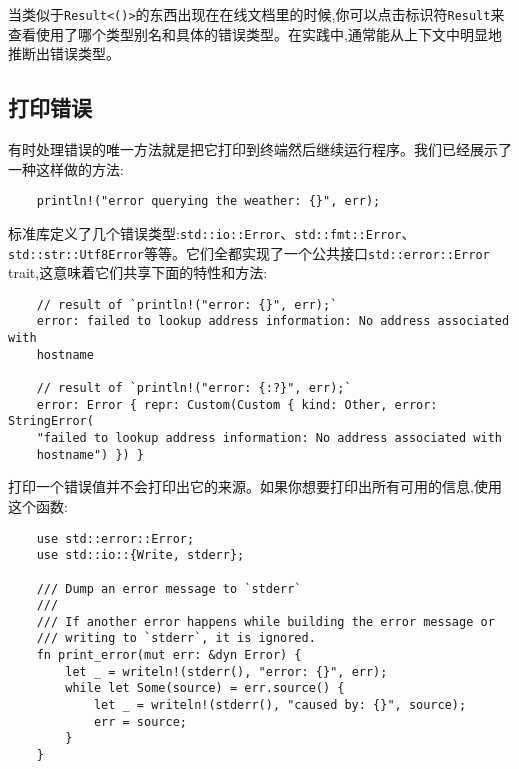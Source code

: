 当类似于\texttt{Result<()>}的东西出现在在线文档里的时候,你可以点击标识符\texttt{Result}来查看使用了哪个类型别名和具体的错误类型。在实践中,通常能从上下文中明显地推断出错误类型。

\subsection{打印错误}\label{printerror}
有时处理错误的唯一方法就是把它打印到终端然后继续运行程序。我们已经展示了一种这样做的方法:
\begin{verbatim}
    println!("error querying the weather: {}", err);
\end{verbatim}

标准库定义了几个错误类型:\texttt{std::io::Error}、\texttt{std::fmt::Error}、\texttt{std::str::Utf8Error}等等。它们全都实现了一个公共接口\texttt{std::error::Error} trait,这意味着它们共享下面的特性和方法:

\begin{verbatim}
    // result of `println!("error: {}", err);`
    error: failed to lookup address information: No address associated with
    hostname

    // result of `println!("error: {:?}", err);`
    error: Error { repr: Custom(Custom { kind: Other, error: StringError(
    "failed to lookup address information: No address associated with
    hostname") }) }
\end{verbatim}



打印一个错误值并不会打印出它的来源。如果你想要打印出所有可用的信息,使用这个函数:
\begin{verbatim}
    use std::error::Error;
    use std::io::{Write, stderr};

    /// Dump an error message to `stderr`
    ///
    /// If another error happens while building the error message or
    /// writing to `stderr`, it is ignored.
    fn print_error(mut err: &dyn Error) {
        let _ = writeln!(stderr(), "error: {}", err);
        while let Some(source) = err.source() {
            let _ = writeln!(stderr(), "caused by: {}", source);
            err = source;
        }
    }
\end{verbatim}

